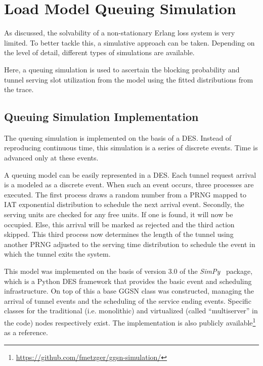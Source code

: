 \section{Load Model Queuing Simulation} 
\label{c4:sec:simulation}

As discussed, the solvability of a non-stationary Erlang loss system is very limited. To better tackle this, a simulative approach can be taken. Depending on the level of detail, different types of simulations are available.

Here, a queuing simulation is used to ascertain the blocking probability and tunnel serving slot utilization from the model using the fitted distributions from the trace.


\subsection{Queuing Simulation Implementation}

The queuing simulation is implemented on the basis of a \gls{DES}. Instead of reproducing continuous time, this simulation is a series of discrete events. Time is advanced only at these events. 

A queuing model can be easily represented in a \gls{DES}.  Each tunnel request arrival is a modeled as a discrete event. When such an event occurs, three processes are executed. The first process draws a random number from a \gls{PRNG} mapped to \gls{IAT} exponential distribution to schedule the next arrival event. Secondly, the serving units are checked for any free units. If one is found, it will now be occupied. Else, this arrival will be marked as rejected and the third action skipped. This third process now determines the length of the tunnel using another \gls{PRNG} adjusted to the serving time distribution to schedule the event in which the tunnel exits the system.

This model was implemented on the basis of version 3.0 of the \textit{SimPy}~\cite{simpy} package, which is a Python \gls{DES} framework that provides the basic event and scheduling infrastructure. On top of this a base \gls{GGSN} class was constructed, managing the arrival of tunnel events and the scheduling of the service ending events. Specific classes for the traditional (i.e. monolithic) and virtualized (called ``multiserver'' in the code) nodes respectively exist. The implementation is also publicly available\footnote{\url{https://github.com/fmetzger/ggsn-simulation/}} as a reference. 



